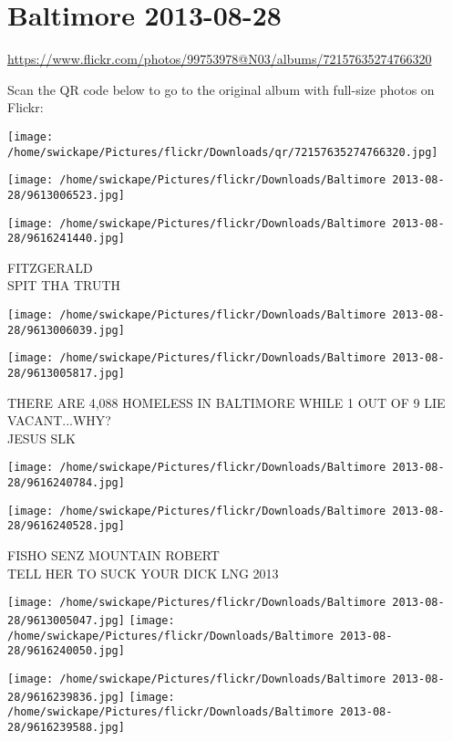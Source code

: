 \documentclass[10pt,letterpaper]{article}
\title{}
\author{}
\date{}
\begin{document}
\section*{Baltimore 2013-08-28}

\url{https://www.flickr.com/photos/99753978@N03/albums/72157635274766320}

Scan the QR code below to go to the original album with full-size photos on Flickr:

\texttt{[image: /home/swickape/Pictures/flickr/Downloads/qr/72157635274766320.jpg]}
\pagebreak

\texttt{[image: /home/swickape/Pictures/flickr/Downloads/Baltimore 2013-08-28/9613006523.jpg]}

\vspace{0.25in}
\texttt{[image: /home/swickape/Pictures/flickr/Downloads/Baltimore 2013-08-28/9616241440.jpg]}

FITZGERALD\\
SPIT THA TRUTH
\pagebreak

\texttt{[image: /home/swickape/Pictures/flickr/Downloads/Baltimore 2013-08-28/9613006039.jpg]}

\vspace{0.25in}
\texttt{[image: /home/swickape/Pictures/flickr/Downloads/Baltimore 2013-08-28/9613005817.jpg]}

THERE ARE 4,088 HOMELESS IN BALTIMORE WHILE 1 OUT OF 9 LIE VACANT...WHY?\\
JESUS SLK
\pagebreak

\texttt{[image: /home/swickape/Pictures/flickr/Downloads/Baltimore 2013-08-28/9616240784.jpg]}

\vspace{0.25in}
\texttt{[image: /home/swickape/Pictures/flickr/Downloads/Baltimore 2013-08-28/9616240528.jpg]}

FISHO SENZ MOUNTAIN ROBERT\\
TELL HER TO SUCK YOUR DICK LNG 2013
\pagebreak

\texttt{[image: /home/swickape/Pictures/flickr/Downloads/Baltimore 2013-08-28/9613005047.jpg]}
\texttt{[image: /home/swickape/Pictures/flickr/Downloads/Baltimore 2013-08-28/9616240050.jpg]}

\texttt{[image: /home/swickape/Pictures/flickr/Downloads/Baltimore 2013-08-28/9616239836.jpg]}
\texttt{[image: /home/swickape/Pictures/flickr/Downloads/Baltimore 2013-08-28/9616239588.jpg]}
\end{document}
